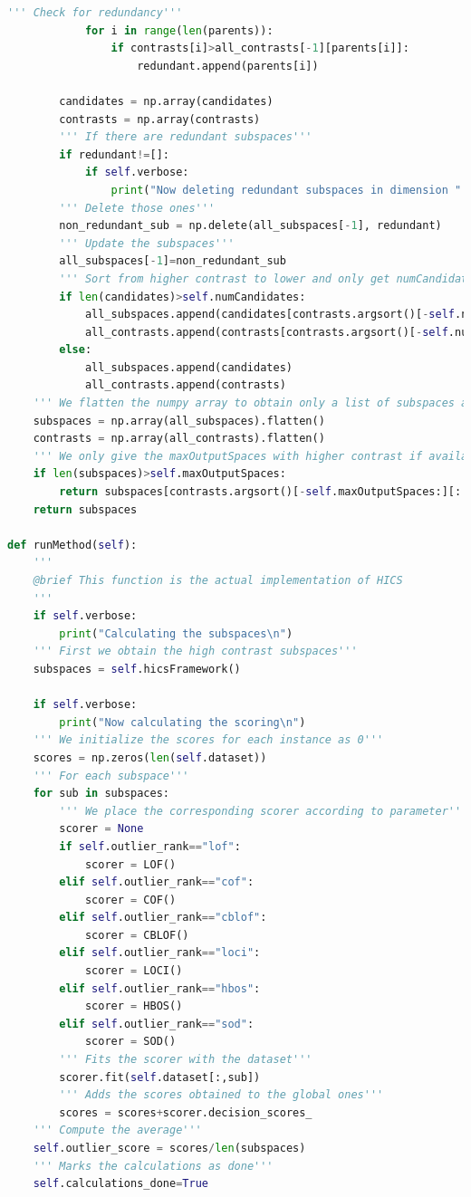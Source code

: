 \begin{lstlisting}[language=Python]
			''' Check for redundancy'''
			for i in range(len(parents)):
				if contrasts[i]>all_contrasts[-1][parents[i]]:
					redundant.append(parents[i])
		
		candidates = np.array(candidates)
		contrasts = np.array(contrasts)
		''' If there are redundant subspaces'''
		if redundant!=[]:
			if self.verbose:
				print("Now deleting redundant subspaces in dimension " + str(dimension) + ", " + str(len(redundant)) + " subspaces removed.")
		''' Delete those ones'''
		non_redundant_sub = np.delete(all_subspaces[-1], redundant)
		''' Update the subspaces'''
		all_subspaces[-1]=non_redundant_sub
		''' Sort from higher contrast to lower and only get numCandidates number of subspaces if available'''
		if len(candidates)>self.numCandidates:
			all_subspaces.append(candidates[contrasts.argsort()[-self.numCandidates:][::-1]])
			all_contrasts.append(contrasts[contrasts.argsort()[-self.numCandidates:][::-1]])
		else:
			all_subspaces.append(candidates)
			all_contrasts.append(contrasts)
	''' We flatten the numpy array to obtain only a list of subspaces and contrasts'''
	subspaces = np.array(all_subspaces).flatten()
	contrasts = np.array(all_contrasts).flatten()
	''' We only give the maxOutputSpaces with higher contrast if available'''
	if len(subspaces)>self.maxOutputSpaces:
		return subspaces[contrasts.argsort()[-self.maxOutputSpaces:][::-1]]
	return subspaces

def runMethod(self):
	'''
	@brief This function is the actual implementation of HICS
	'''
	if self.verbose:
		print("Calculating the subspaces\n")
	''' First we obtain the high contrast subspaces'''
	subspaces = self.hicsFramework()
	
	if self.verbose:
		print("Now calculating the scoring\n")
	''' We initialize the scores for each instance as 0'''
	scores = np.zeros(len(self.dataset))
	''' For each subspace'''
	for sub in subspaces:
		''' We place the corresponding scorer according to parameter'''
		scorer = None
		if self.outlier_rank=="lof":
			scorer = LOF()
		elif self.outlier_rank=="cof":
			scorer = COF()
		elif self.outlier_rank=="cblof":
			scorer = CBLOF()
		elif self.outlier_rank=="loci":
			scorer = LOCI()
		elif self.outlier_rank=="hbos":
			scorer = HBOS()
		elif self.outlier_rank=="sod":
			scorer = SOD()
		''' Fits the scorer with the dataset'''
		scorer.fit(self.dataset[:,sub])
		''' Adds the scores obtained to the global ones'''
		scores = scores+scorer.decision_scores_
	''' Compute the average'''
	self.outlier_score = scores/len(subspaces)
	''' Marks the calculations as done'''
	self.calculations_done=True
\end{lstlisting}

